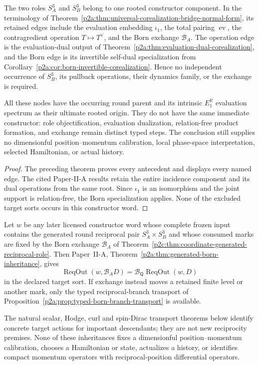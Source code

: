 \documentclass[12pt,a4paper]{article}
\begin{document}
\begin{corollary}
\label{p2c:cor:s3-universal-corealization-bridge}
The two roles \(S^3_A\) and \(S^3_B\) belong to one rooted constructor
component.  In the terminology of
Theorem~\ref{p2a:thm:universal-corealization-bridge-normal-form}, its retained
edges include the evaluation embedding \(\iota_1\), the total pairing
\(\operatorname{ev}\), the contragredient operation
\(T\mapsto T^\vee\), and the Born exchange \(\mathcal B_A\).  The operation
edge is the evaluation-dual output of
Theorem~\ref{p2a:thm:evaluation-dual-corealization}, and the Born edge is its
invertible self-dual specialization from
Corollary~\ref{p2a:cor:born-invertible-corealization}.  Hence no independent
occurrence of \(S^3_B\), its pullback operations, their dynamics family, or
the exchange is required.

All these nodes have the occurring round parent and its intrinsic
\(E_1^{\mathbb R}\) evaluation spectrum as their ultimate rooted origin.
They do not have the same immediate constructor: role objectification,
evaluation dualization, relation-free product formation, and exchange remain
distinct typed steps.  The conclusion still supplies no dimensionful
position--momentum calibration, local phase-space interpretation, selected
Hamiltonian, or actual history.
\end{corollary}

\begin{proof}
The preceding theorem proves every antecedent and displays every named edge.
The cited Paper-II-A results retain the entire incidence component and its
dual operations from the same root.  Since \(\iota_1\) is an isomorphism and
the joint support is relation-free, the Born specialization applies.  None of
the excluded target sorts occurs in this constructor word.
\end{proof}

\begin{corollary}
\label{p2c:cor:hereditary-born-covariance}
Let \(w\) be any later licensed constructor word whose complete frozen input
contains the generated round reciprocal pair
\(S_A^3\times S_B^3\) and whose consumed marks are fixed by the Born exchange
\(\mathcal B_A\) of
Theorem~\ref{p2c:thm:coordinate-generated-reciprocal-role}.  Then
Paper~II-A, Theorem~\ref{p2a:thm:generated-born-inheritance}, gives
\[
 \operatorname{ReqOut}(w,\mathcal B_A D)
 =\mathcal B_{\mathsf Q}\operatorname{ReqOut}(w,D)
\]
in the declared target sort.  If exchange instead moves a retained finite
level or another mark, only the typed reciprocal-branch transport of
Proposition~\ref{p2a:prop:typed-born-branch-transport} is available.

The natural scalar, Hodge, curl and spin-Dirac transport theorems below
identify concrete target actions for important descendants; they are not new
reciprocity premises.  None of these inheritances fixes a dimensionful
position--momentum calibration, chooses a Hamiltonian or state, actualizes a
history, or identifies compact momentum operators with reciprocal-position
differential operators.
\end{corollary}
\end{document}
